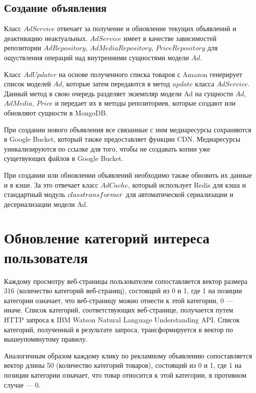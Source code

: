 \documentclass[specification,annotation,times]{itmo-student-thesis}
\begin{document}
\subsection{Создание объявления}

Класс $AdService$ отвечает за получение и обновление текущих объявлений и деактивацию неактуальных. $AdService$ имеет в качестве зависимостей репозитории $AdRepository$, $AdMediaRepository$, $PriceRepository$ для ощуствления операций над внутренними сущностями модели $Ad$.


Класс $AdUpdater$ на основе полученного списка товаров с Amazon генерирует список моделей $Ad$, которые затем передаются в метод $update$  класса $AdService$. Данный метод в свою очередь разделяет экземпляр модели Ad на сущности $Ad$, $AdMedia$, $Price$ и передает их в методы репозиториев, которые создают или обновляют сущности в MongoDB.

При создании нового объявления все связанные с ним медиаресурсы сохраняются в Google Bucket, который также предоставляет функции CDN. Медиаресурсы уникализируются по ссылке для того, чтобы не создавать копии уже сущетвующих файлов в Google Bucket. 

При создании или обновлении объявлений необходимо также обновить их данные и в кэше. За это отвечает класс $AdCache$, который использует Redis для кэша и стандартный модуль $class\-transformer$  для автоматической сериализации и десериализации модели Ad.




\section{Обновление категорий интереса пользователя}

Каждому просмотру веб-страницы пользователем сопоставляется вектор размера 316 (количество категорий веб-страниц), состоящий из 0 и 1, где 1 на позиции категории означает, что веб-страницу можно отнести к этой категории, 0 — иначе. Список категорий, соответствующих веб-странице, получается путем HTTP запроса к IBM Watson Natural Language Understanding API. Список категорий, полученный в результате запроса, трансформируется в вектор по вышеупомянутому правилу.


Аналогичным образом каждому клику по рекламному объявлению сопоставляется вектор длины 50 (количество категорий товаров), состоящий из 0 и 1, где 1 на позиции категории означает, что товар относится к этой категории, в противном случае — 0.
\end{document}
